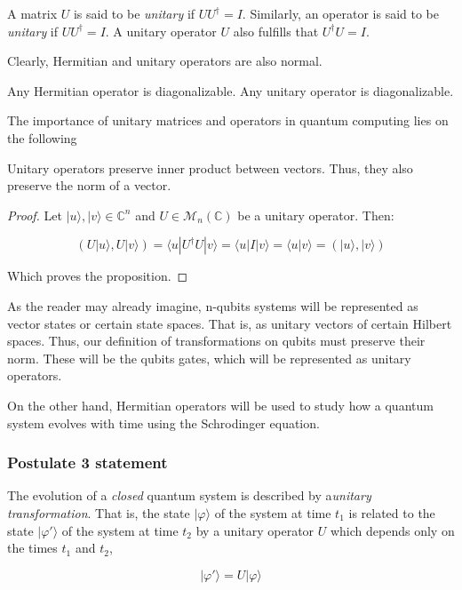 \documentclass{article}
\begin{document}
	\begin{definition}
		A matrix $U$ is said to be \emph{unitary} if $UU^\dagger = I$. Similarly, an operator is said to be \emph{unitary} if $UU^\dagger = I$. A unitary operator $U$ also fulfills that $U^\dagger U = I$.
	\end{definition}
	
	Clearly, Hermitian and unitary operators are also normal.
	
	\begin{corollary}
		Any Hermitian operator is diagonalizable. Any unitary operator is diagonalizable.
	\end{corollary}
	
	The importance of unitary matrices and operators in quantum computing lies on the following
	
	\begin{proposition}
		Unitary operators preserve inner product between vectors. Thus, they also preserve the norm of a vector.
	\end{proposition}
	
	\begin{proof}
		Let $|u\rangle, |v\rangle \in \mathds{C}^n$ and $U \in \mathcal{M}_n(\mathds{C})$ be a unitary operator. Then:
		
		$$ ( U|u\rangle, U|v\rangle) = \langle u|U^\dagger U|v\rangle = \langle u|I|v\rangle = \langle u|v\rangle = ( |u\rangle, |v\rangle) $$
		
		Which proves the proposition.
	\end{proof}
	
	As the reader may already imagine, n-qubits systems will be represented as vector states or certain state spaces. That is, as unitary vectors of certain Hilbert spaces. Thus, our definition of transformations on qubits must preserve their norm. These will be the qubits gates, which will be represented as unitary operators.
	
	On the other hand, Hermitian operators will be used to study how a quantum system evolves with time using the Schrodinger equation.
	
	
	\subsubsection{Postulate 3 statement}
	
	
	\begin{postulate}
		The evolution of a \emph{closed} quantum system is described by a\emph{unitary transformation}. That is, the state $|\varphi\rangle$ of the system at time $t_1$ is related to the state $|\varphi'\rangle$ of the system at time $t_2$ by a unitary operator $U$ which depends only on the times $t_1$ and $t_2$,
		
		$$ |\varphi'\rangle = U|\varphi\rangle $$
	\end{postulate}
	
\end{document}
